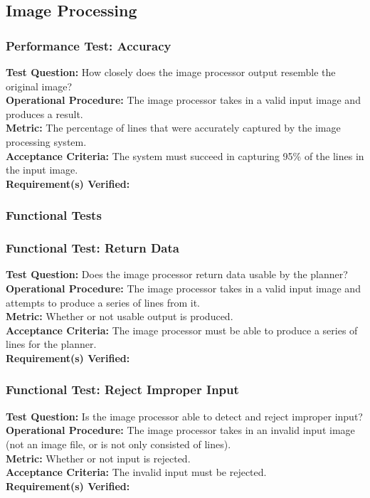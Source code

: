 
\subsection{Image Processing}
\label{sec:verification_image}


\subsubsection{Performance Test: Accuracy}
\label{sec:image_pt_accuracy}
\textbf{Test Question:} How closely does the image processor output resemble the original image?\\
\textbf{Operational Procedure:} The image processor takes in a valid input image and produces a result.\\
\textbf{Metric:} The percentage of lines that were accurately captured by the image processing system.\\
\textbf{Acceptance Criteria:} The system must succeed in capturing 95\% of the lines in the input image.\\
\textbf{Requirement(s) Verified:} 

\subsubsection{Functional Tests}
\label{sec:image_ft}

\subsubsection{Functional Test: Return Data}
\label{sec:image_ft_data}
\textbf{Test Question:} Does the image processor return data usable by the planner?\\
\textbf{Operational Procedure:} The image processor takes in a valid input image and attempts to produce a series of lines from it.\\
\textbf{Metric:} Whether or not usable output is produced.\\
\textbf{Acceptance Criteria:} The image processor must be able to produce a series of lines for the planner.\\
\textbf{Requirement(s) Verified:} 

\subsubsection{Functional Test: Reject Improper Input}
\label{sec:image_ft_reject}
\textbf{Test Question:} Is the image processor able to detect and reject improper input?\\
\textbf{Operational Procedure:} The image processor takes in an invalid input image (not an image file, or is not only consisted of lines). \\
\textbf{Metric:} Whether or not input is rejected.\\
\textbf{Acceptance Criteria:} The invalid input must be rejected.\\
\textbf{Requirement(s) Verified:} 

